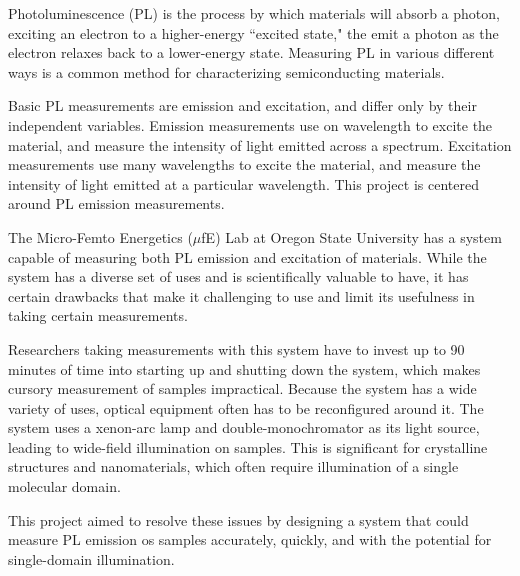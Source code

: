 
Photoluminescence (PL) is the process by which materials will absorb a photon, exciting an electron to a higher-energy ``excited state," the emit a photon as the electron relaxes back to a lower-energy state. Measuring PL in various different ways is a common method for characterizing semiconducting materials.

Basic PL measurements are emission and excitation, and differ only by their independent variables. Emission measurements use on wavelength to excite the material, and measure the intensity of light emitted across a spectrum. Excitation measurements use many wavelengths to excite the material, and measure the intensity of light emitted at a particular wavelength. This project is centered around PL emission measurements.

The Micro-Femto Energetics ($\mu$fE) Lab at Oregon State University has a system capable of measuring both PL emission and excitation of materials. While the system has a diverse set of uses and is scientifically valuable to have, it has certain drawbacks that make it challenging to use and limit its usefulness in taking certain measurements.

Researchers taking measurements with this system have to invest up to 90 minutes of time into starting up and shutting down the system, which makes cursory measurement of samples impractical. Because the system has a wide variety of uses, optical equipment often has to be reconfigured around it. The system uses a xenon-arc lamp and double-monochromator as its light source, leading to wide-field illumination on samples. This is significant for crystalline structures and nanomaterials, which often require illumination of a single molecular domain.

This project aimed to resolve these issues by designing a system that could measure PL emission os samples accurately, quickly, and with the potential for single-domain illumination.

